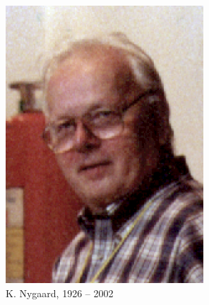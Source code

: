 \documentclass{slides}
\begin{document}
\begin{frame}
\begin{columns}[c,onlytextwidth]
    \includegraphics[height=0.25\textheight]{nygaard}\\
    {\tiny K. Nygaard, 1926 -- 2002}
  \end{columns}
\end{frame}
\end{document}
